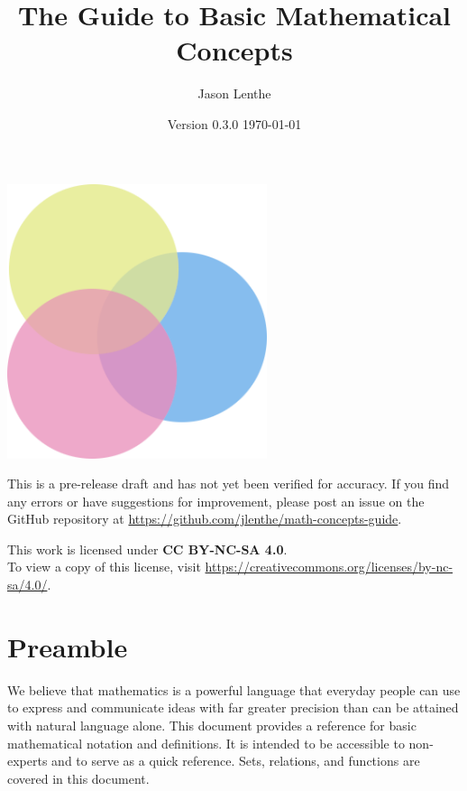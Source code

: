 \documentclass[letterpaper]{article}
\title{\sffamily\textbf{The Guide to Basic Mathematical Concepts}}
\author{\sffamily Jason Lenthe}
\date{Version 0.3.0 \quad \today}
\begin{document}
\maketitle
\vskip 0.5in
\begin{center}
    \includegraphics[width=3in]{images/logo.png}
\end{center}

\vfill
\begin{warning}
  This is a pre-release draft and has not yet been verified for accuracy.
  If you find any errors or have suggestions for improvement, please post
  an issue on the GitHub repository at
  \url{https://github.com/jlenthe/math-concepts-guide}.
\end{warning}
\begin{center}
    {\small This work is licensed under \textbf{CC BY-NC-SA 4.0}.\\
    To view a copy of this license, visit \url{https://creativecommons.org/licenses/by-nc-sa/4.0/}.}
\end{center}

\newpage
\tableofcontents
\newpage

\section*{Preamble}
We believe that mathematics is a powerful language that everyday people can
use to express and communicate ideas with far greater precision than can be
attained with natural language alone. This document provides a reference for
basic mathematical notation and definitions. It is intended to be accessible
to non-experts and to serve as a quick reference. Sets, relations, and
functions are covered in this document.








\end{document}
